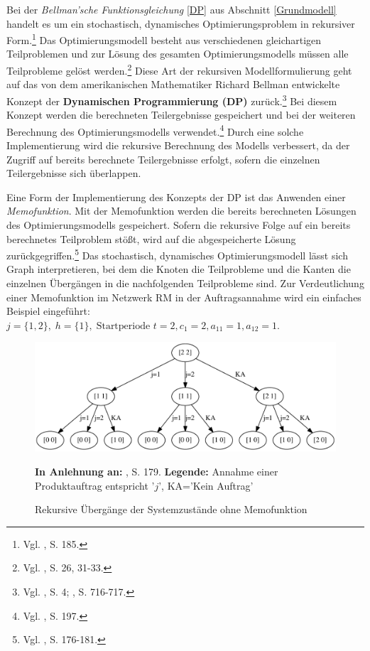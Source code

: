 Bei der \textit{Bellman'sche Funktionsgleichung} \eqref{DP} aus Abschnitt \ref{Grundmodell} handelt es um ein stochastisch, dynamisches Optimierungsproblem in rekursiver Form.\footnote{Vgl. \cite{Petrick:2009aa}, S. 185.} Das Optimierungsmodell besteht aus verschiedenen gleichartigen Teilproblemen und zur Lösung des gesamten Optimierungsmodells müssen alle Teilprobleme gelöst werden.\footnote{Vgl. \cite{powell2007approximate}, S. 26, 31-33.} Diese Art der rekursiven Modellformulierung geht auf das von dem amerikanischen Mathematiker Richard Bellman entwickelte Konzept der \textbf{Dynamischen Programmierung (DP)} zurück.\footnote{Vgl. \cite{bellman1954theory}, S. 4; \cite{Bellman:1952aa}, S. 716-717.} Bei diesem Konzept werden die berechneten Teilergebnisse gespeichert und bei der weiteren Berechnung des Optimierungsmodells verwendet.\footnote{Vgl. \cite{owsnicki1999algorithmen}, S. 197.} Durch eine solche Implementierung wird die rekursive Berechnung des Modells verbessert, da der Zugriff auf bereits berechnete Teilergebnisse erfolgt, sofern die einzelnen Teilergebnisse sich überlappen.

Eine Form der Implementierung des Konzepts der DP ist das Anwenden einer \textit{Memofunktion}. Mit der Memofunktion werden die bereits berechneten Lösungen des Optimierungsmodells gespeichert. Sofern die rekursive Folge auf ein bereits berechnetes Teilproblem stößt, wird auf die abgespeicherte Lösung zurückgegriffen.\footnote{Vgl. \cite{hetland2010python}, S. 176-181.} Das stochastisch, dynamisches Optimierungsmodell lässt sich Graph interpretieren, bei dem die Knoten die Teilprobleme und die Kanten die einzelnen Übergängen in die nachfolgenden Teilprobleme sind. Zur Verdeutlichung einer Memofunktion im Netzwerk RM in der Auftragsannahme wird ein einfaches Beispiel eingeführt: $j = \{1, 2\}, \; h = \{1\}, \; \text{Startperiode } t=2, c_{1}=2, a_{11}=1, a_{12}=1.$

\begin{figure}[h!]
  \begin{center}
    \includegraphics[width=140mm]{Bilder/Einfach.pdf}
    \caption{Rekursive Übergänge der Systemzustände ohne Memofunktion}  \label{Einfach}
        {\footnotesize \textbf{In Anlehnung an:} \cite{hetland2010python}, S. 179.} 
    {\footnotesize \textbf{Legende:} Annahme einer Produktauftrag entspricht '$j$', KA='Kein Auftrag'} 
  \end{center}
\end{figure}

